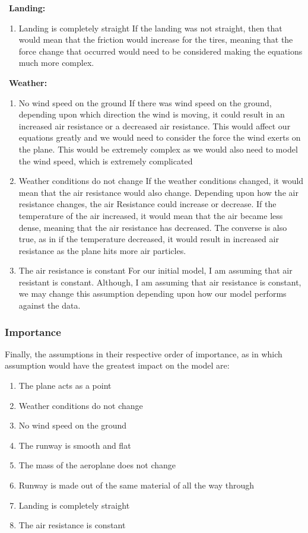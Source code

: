 \
\textbf{Landing:} 
\begin{enumerate}
    \item Landing is completely straight
    If the landing was not straight, then that would mean that the friction would increase for the tires, meaning that the force change that occurred would need to be considered making the equations much more complex.
    
\end{enumerate}
\
\textbf{Weather:} 
\begin{enumerate}
    \item No wind speed on the ground
    If there was wind speed on the ground, depending upon which direction the wind is moving, it could result in an increased air resistance or a decreased air resistance. This would affect our equations greatly and we would need to consider the force the wind exerts on the plane. This would be extremely complex as we would also need to model the wind speed, which is extremely complicated
    
    \item Weather conditions do not change
    If the weather conditions changed, it would mean that the air resistance would also change. Depending upon how the air resistance changes, the air Resistance could increase or decrease. If the temperature of the air increased, it would mean that the air became less dense, meaning that the air resistance has decreased. The converse is also true, as in if the temperature decreased, it would result in increased air resistance as the plane hits more air particles.
    
    \item The air resistance is constant
    For our initial model, I am assuming that air resistant is constant. Although, I am assuming that air resistance is constant, we may change this assumption depending upon how our model performs against the data.
    
\end{enumerate}

\subsubsection{Importance}
Finally, the assumptions in their respective order of importance, as in which assumption would have the greatest impact on the model are:
\begin{enumerate}
    \item The plane acts as a point
    \item Weather conditions do not change
    \item No wind speed on the ground
    \item The runway is smooth and flat
    \item The mass of the aeroplane does not change
    \item Runway is made out of the same material of all the way through
    \item Landing is completely straight
    \item The air resistance is constant
\end{enumerate}

